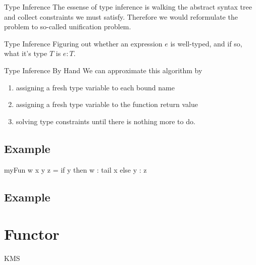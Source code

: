 \documentclass[openany, 12pt]{book}
\begin{document}
\begin{intuition}{Type Inference}
  The essense of type inference is walking the abstract syntax tree and
  collect constraints we must satisfy. Therefore we would reformulate the
  problem to so-called unification problem.
\end{intuition}

\begin{definition}{Type Inference}{}
  Figuring out whether an expression $e$ is well-typed, and if so, what it's
  type $T$ is $e: T$.
\end{definition}

\begin{definition}{Type Inference By Hand}{}
  We can approximate this algorithm by
  \begin{enumerate}
    \item assigning a fresh type variable to each bound name
    \item assigning a fresh type variable to the function return value
    \item solving type constraints until there is nothing more to do.
  \end{enumerate}
\end{definition}

\section{Example}
\begin{haskell}{}
myFun w x y z = if y then w : tail x else y : z
\end{haskell}

\section{Example}

\chapter{Functor}
\gls{KMS}

\clearpage
\printglossaries

\printindex{}
\end{document}
